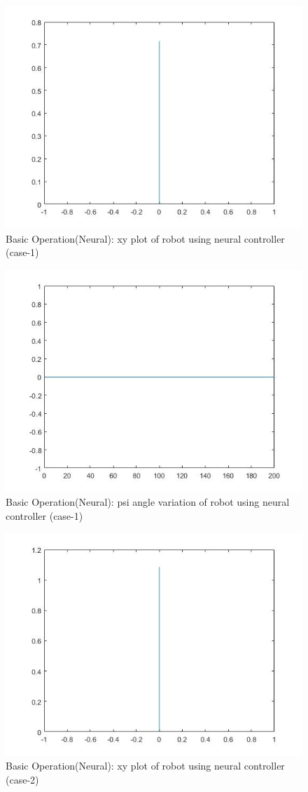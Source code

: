 \documentclass{l4proj}
\begin{document}
\begin{figure}[htb]
    \centering
    \includegraphics[width=0.5\linewidth]{images/Neuraltest1fig2.jpg}

    \caption{Basic Operation(Neural): xy plot of robot using neural controller (case-1)}
    \label{fig:Model1sim4} 
\end{figure}
\begin{figure}[htb]
    \centering
    \includegraphics[width=0.5\linewidth]{images/Neuraltest1fig4.jpg}

    \caption{Basic Operation(Neural): psi angle variation of robot using neural controller (case-1)}
    \label{fig:Model1sim4} 
\end{figure}
\begin{figure}[htb]
    \centering
    \includegraphics[width=0.5\linewidth]{images/Neuraltest2fig2.jpg}

    \caption{Basic Operation(Neural): xy plot of robot using neural controller (case-2)}
    \label{fig:Model1sim4} 
\end{figure}
\end{document}
